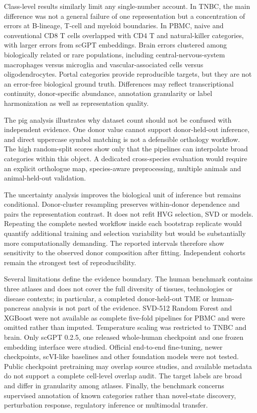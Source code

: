Class-level results similarly limit any single-number account. In TNBC, the main difference was not a general failure of one representation but a concentration of errors at B-lineage, T-cell and myeloid boundaries. In PBMC, naive and conventional CD8 T cells overlapped with CD4 T and natural-killer categories, with larger errors from scGPT embeddings. Brain errors clustered among biologically related or rare populations, including central-nervous-system macrophages versus microglia and vascular-associated cells versus oligodendrocytes. Portal categories provide reproducible targets, but they are not an error-free biological ground truth. Differences may reflect transcriptional continuity, donor-specific abundance, annotation granularity or label harmonization as well as representation quality.

The pig analysis illustrates why dataset count should not be confused with independent evidence. One donor value cannot support donor-held-out inference, and direct uppercase symbol matching is not a defensible orthology workflow. The high random-split scores show only that the pipelines can interpolate broad categories within this object. A dedicated cross-species evaluation would require an explicit orthologue map, species-aware preprocessing, multiple animals and animal-held-out validation.

The uncertainty analysis improves the biological unit of inference but remains conditional. Donor-cluster resampling preserves within-donor dependence and pairs the representation contrast. It does not refit HVG selection, SVD or models. Repeating the complete nested workflow inside each bootstrap replicate would quantify additional training and selection variability but would be substantially more computationally demanding. The reported intervals therefore show sensitivity to the observed donor composition after fitting. Independent cohorts remain the strongest test of reproducibility.

Several limitations define the evidence boundary. The human benchmark contains three atlases and does not cover the full diversity of tissues, technologies or disease contexts; in particular, a completed donor-held-out TME or human-pancreas analysis is not part of the evidence. SVD-512 Random Forest and XGBoost were not available as complete five-fold pipelines for PBMC and were omitted rather than imputed. Temperature scaling was restricted to TNBC and brain. Only scGPT 0.2.5, one released whole-human checkpoint and one frozen embedding interface were studied. Official end-to-end fine-tuning, newer checkpoints, scVI-like baselines and other foundation models were not tested. Public checkpoint pretraining may overlap source studies, and available metadata do not support a complete cell-level overlap audit. The target labels are broad and differ in granularity among atlases. Finally, the benchmark concerns supervised annotation of known categories rather than novel-state discovery, perturbation response, regulatory inference or multimodal transfer.


